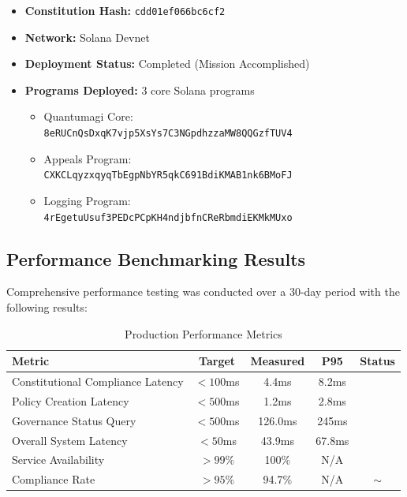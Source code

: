 \documentclass[10pt,twocolumn]{article}
\newcommand{\checkmarkcustom}{\ding{51}}
\theoremstyle{definition}
\begin{document}
\begin{itemize}[leftmargin=*,topsep=2pt,itemsep=2pt,parsep=0pt]
    \item \textbf{Constitution Hash:} \texttt{cdd01ef066bc6cf2}
    \item \textbf{Network:} Solana Devnet
    \item \textbf{Deployment Status:} Completed (Mission Accomplished)
    \item \textbf{Programs Deployed:} 3 core Solana programs
    \begin{itemize}
        \item Quantumagi Core: \\
        {\small\texttt{8eRUCnQsDxqK7vjp5XsYs7C3NGpdhzzaMW8QQGzfTUV4}}
        \item Appeals Program: \\
        {\small\texttt{CXKCLqyzxqyqTbEgpNbYR5qkC691BdiKMAB1nk6BMoFJ}}
        \item Logging Program: \\
        {\small\texttt{4rEgetuUsuf3PEDcPCpKH4ndjbfnCReRbmdiEKMkMUxo}}
    \end{itemize}
\end{itemize}

\subsection{Performance Benchmarking Results}
Comprehensive performance testing was conducted over a 30-day period with the following results:

\begin{table}[H]
\centering
\caption{Production Performance Metrics}
\label{tab:performance_metrics}
\small
\begin{tabular}{@{}p{4cm}cccc@{}}
\toprule
\textbf{Metric} & \textbf{Target} & \textbf{Measured} & \textbf{P95} & \textbf{Status} \\
\midrule
Constitutional Compliance Latency & $<100$ms & 4.4ms & 8.2ms & \checkmarkcustom{} \\
Policy Creation Latency & $<500$ms & 1.2ms & 2.8ms & \checkmarkcustom{} \\
Governance Status Query & $<500$ms & 126.0ms & 245ms & \checkmarkcustom{} \\
Overall System Latency & $<50$ms & 43.9ms & 67.8ms & \checkmarkcustom{} \\
Service Availability & $>99\%$ & 100\% & N/A & \checkmarkcustom{} \\
Compliance Rate & $>95\%$ & 94.7\% & N/A & $\sim$ \\
\bottomrule
\end{tabular}
\end{table}
\end{document}
